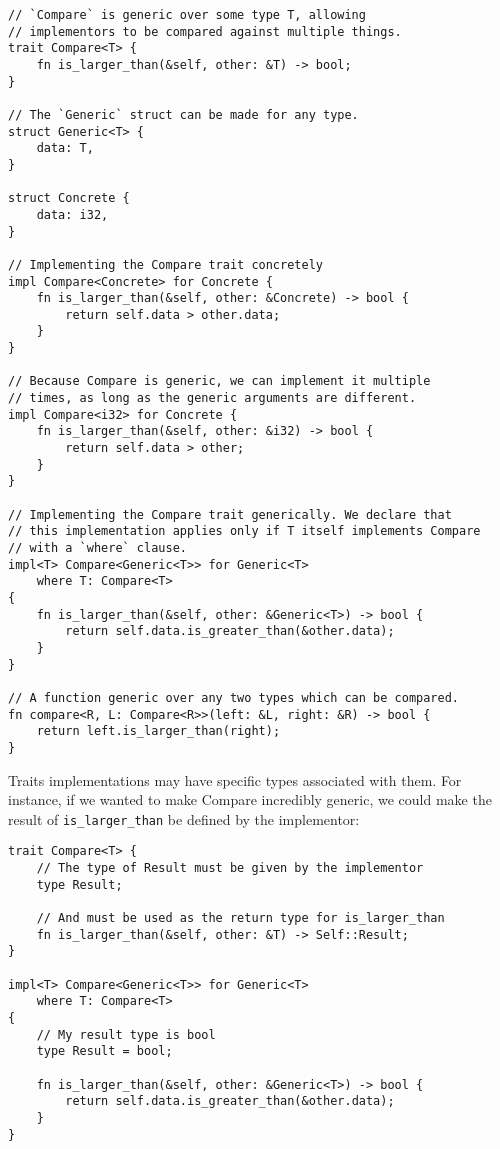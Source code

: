 \begin{verbatim}
// `Compare` is generic over some type T, allowing
// implementors to be compared against multiple things.
trait Compare<T> {
    fn is_larger_than(&self, other: &T) -> bool;
}

// The `Generic` struct can be made for any type.
struct Generic<T> {
    data: T,
}

struct Concrete {
    data: i32,
}

// Implementing the Compare trait concretely
impl Compare<Concrete> for Concrete {
    fn is_larger_than(&self, other: &Concrete) -> bool {
        return self.data > other.data;
    }
}

// Because Compare is generic, we can implement it multiple
// times, as long as the generic arguments are different.
impl Compare<i32> for Concrete {
    fn is_larger_than(&self, other: &i32) -> bool {
        return self.data > other;
    }
}

// Implementing the Compare trait generically. We declare that
// this implementation applies only if T itself implements Compare
// with a `where` clause.
impl<T> Compare<Generic<T>> for Generic<T>
    where T: Compare<T>
{
    fn is_larger_than(&self, other: &Generic<T>) -> bool {
        return self.data.is_greater_than(&other.data);
    }
}

// A function generic over any two types which can be compared.
fn compare<R, L: Compare<R>>(left: &L, right: &R) -> bool {
    return left.is_larger_than(right);
}
\end{verbatim}

Traits implementations may have specific types associated with them.
For instance, if we wanted to make Compare incredibly generic, we could
make the result of \texttt{is_larger_than} be defined by the
implementor:

\begin{verbatim}
trait Compare<T> {
    // The type of Result must be given by the implementor
    type Result;

    // And must be used as the return type for is_larger_than
    fn is_larger_than(&self, other: &T) -> Self::Result;
}

impl<T> Compare<Generic<T>> for Generic<T>
    where T: Compare<T>
{
    // My result type is bool
    type Result = bool;

    fn is_larger_than(&self, other: &Generic<T>) -> bool {
        return self.data.is_greater_than(&other.data);
    }
}
\end{verbatim}

